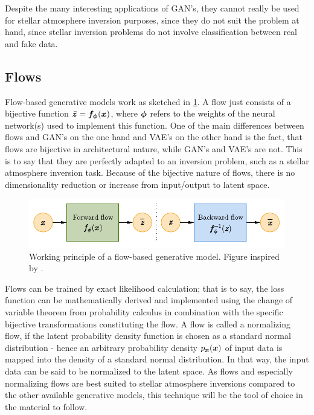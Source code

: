 \documentclass[a4paper,12pt]{report}
\begin{document}
Despite the many interesting applications of GAN's, they cannot really be used for stellar atmosphere inversion purposes, since they do not suit the problem at hand, since stellar inversion problems do not involve classification between real and fake data.

\subsection{Flows}
Flow-based generative models work as sketched in \cref{fig:Flow}. A flow just consists of a bijective function $\bar{\bm{z}} = \bm{f}_{\bm{\phi}}(\bm{x})$, where $\bm{\phi}$ refers to the weights of the neural network(s) used to implement this function. One of the main differences between flows and GAN's on the one hand and VAE's on the other hand is the fact, that flows are bijective in architectural nature, while GAN's and VAE's are not. This is to say that they are perfectly adapted to an inversion problem, such as a stellar atmosphere inversion task. Because of the bijective nature of flows, there is no dimensionality reduction or increase from input/output to latent space.
\begin{figure}[h!]
\centering
\includegraphics[width=\linewidth-4cm]{figures/Flow.pdf}
\caption{Working principle of a flow-based generative model. Figure inspired by \cite{weng2018flow}.}
\label{fig:Flow}
\end{figure}

Flows can be trained by exact likelihood calculation; that is to say, the loss function can be mathematically derived and implemented using the change of variable theorem from probability calculus in combination with the specific bijective transformations constituting the flow. A flow is called a normalizing flow, if the latent probability density function is chosen as a standard normal distribution - hence an arbitrary probability density $p_{\bm{x}}(\bm{x})$ of input data is mapped into the density of a standard normal distribution. In that way, the input data can be said to be normalized to the latent space. As flows and especially normalizing flows are best suited to stellar atmosphere inversions compared to the other available generative models, this technique will be the tool of choice in the material to follow.
\end{document}
